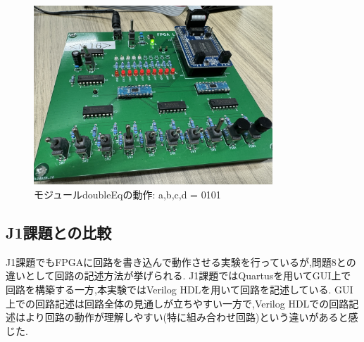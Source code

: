 \documentclass[autodetect-engine, dvi=dvipdfmx, 10pt, a4paper, ja=standard]{bxjsarticle}
\begin{document}
\begin{figure}[H]
	\centering
	\includegraphics[width=0.8\textwidth]{ex8_deq_0101.jpeg}
	\caption{モジュールdoubleEqの動作: a,b,c,d = 0101}
	\label{fig:ex8_deq_0101}
\end{figure}

\subsection{J1課題との比較}
J1課題でもFPGAに回路を書き込んで動作させる実験を行っているが,問題8との違いとして回路の記述方法が挙げられる.
J1課題ではQuartusを用いてGUI上で回路を構築する一方,本実験ではVerilog HDLを用いて回路を記述している.
GUI上での回路記述は回路全体の見通しが立ちやすい一方で,Verilog HDLでの回路記述はより回路の動作が理解しやすい(特に組み合わせ回路)という違いがあると感じた.

\end{document}

